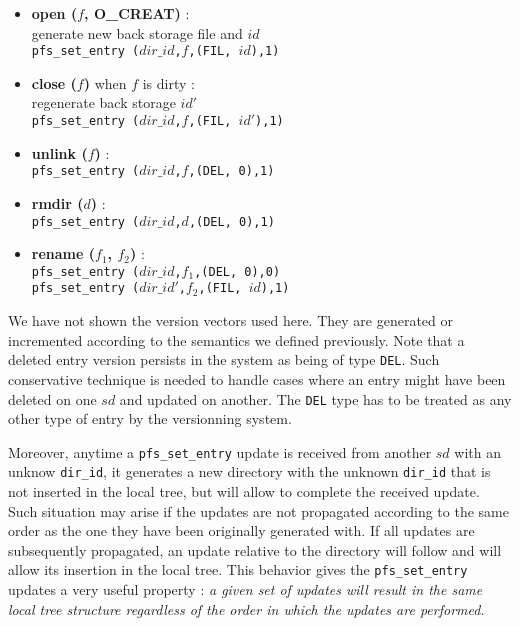 \begin{itemize}
  \item \textbf{open ($f$, O\_CREAT)} : \\
    generate new back storage file and $id$ \\
    {\tt pfs\_set\_entry ($dir\_id$,$f$,(FIL, $id$),1)}

  \item \textbf{close ($f$)} when $f$ is dirty : \\
    regenerate back storage $id'$ \\
    {\tt pfs\_set\_entry ($dir\_id$,$f$,(FIL, $id'$),1)}
    
  \item \textbf{unlink ($f$)} : \\
    {\tt pfs\_set\_entry ($dir\_id$,$f$,(DEL, 0),1)}

  \item \textbf{rmdir ($d$)} : \\
    {\tt pfs\_set\_entry ($dir\_id$,$d$,(DEL, 0),1)}

  \item \textbf{rename ($f_1$, $f_2$)} : \\
    {\tt pfs\_set\_entry ($dir\_id$,$f_1$,(DEL, 0),0)} \\
    {\tt pfs\_set\_entry ($dir\_id'$,$f_2$,(FIL, $id$),1)}
\end{itemize}

We have not shown the version vectors used here. They are generated or
incremented according to the semantics we defined previously. Note
that a deleted entry version persists in the system as being of type
{\tt DEL}. Such conservative technique is needed to handle cases where
an entry might have been deleted on one $sd$ and updated on
another. The {\tt DEL} type has to be treated as any other type of
entry by the versionning system.

Moreover, anytime a {\tt pfs\_set\_entry} update is received from
another $sd$ with an unknow {\tt dir\_id}, it generates a new directory
with the unknown {\tt dir\_id} that is not inserted in the local tree, but
will allow to complete the received update. Such situation may arise
if the updates are not propagated according to the same order as the one they
have been originally generated with. If all updates are subsequently
propagated, an update relative to the directory will follow and will
allow its insertion in the local tree. This behavior gives the 
{\tt pfs\_set\_entry} updates a very useful property : \emph{a given set of
updates will result in the same local tree structure regardless of the
order in which the updates are performed.}

